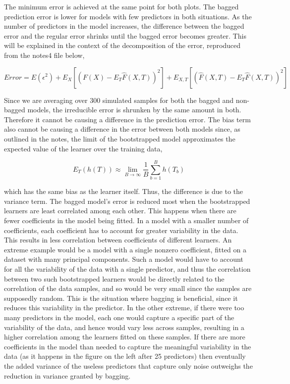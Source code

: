 \documentclass{article}
\begin{document}
The minimum error is achieved at the same point for both plots.
The bagged prediction error is lower for models with few predictors in both situations. As the number of predictors in the model increases, the difference between the bagged error and the regular error shrinks until the bagged error becomes greater. This will be explained in the context of the decomposition of the error, reproduced from the notes4 file below,

\begin{equation*}
Error = E(\epsilon^2) + E_X\left[\left(F(X) - E_T\hat{F}(X,T)\right)^2\right] + E_{X,T}\left[\left(\hat{F}(X, T) - E_T\hat{F}(X,T)\right)^2\right]
\end{equation*}

Since we are averaging over 300 simulated samples for both the bagged and non-bagged models, the irreducible error is shrunken by the same amount in both. Therefore it cannot be causing a difference in the prediction error. The bias term also cannot be causing a difference in the error between both models since, as outlined in the notes, the limit of the bootstrapped model approximates the expected value of the learner over the training data,

\begin{equation*}
E_T(h(T)) \approx \operatorname*{lim}_{B \to \infty} \frac{1}{B}\sum_{b=1}^Bh(T_b)
\end{equation*} 

which has the same bias as the learner itself. Thus, the difference is due to the variance term. The bagged model's error is reduced most when the bootstrapped learners are least correlated among each other. This happens when there are fewer coefficients in the model being fitted. In a model with a smaller number of coefficients, each coefficient has to account for greater variability in the data. This results in less correlation between coefficients of different learners. An extreme example would be a model with a single nonzero coefficient, fitted on a dataset with many principal components. Such a model would have to account for all the variability of the data with a single predictor, and thus the correlation between two such bootstrapped learners would be directly related to the correlation of the data samples, and so would be very small since the samples are supposedly random. This is the situation where bagging is beneficial, since it reduces this variability in the predictor. In the other extreme, if there were too many predictors in the model, each one would capture a specific part of the variability of the data, and hence would vary less across samples, resulting in a higher correlation among the learners fitted on these samples. If there are more coefficients in the model than needed to capture the meaningful variability in the data (as it happens in the figure on the left after 25 predictors) then eventually the added variance of the useless predictors that capture only noise outweighs the reduction in variance granted by bagging.
\end{document}
